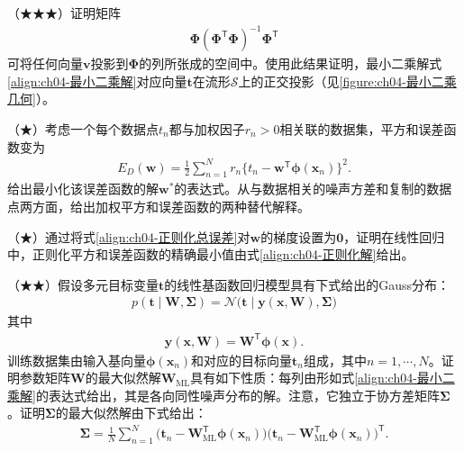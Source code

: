 \documentclass[../../main.tex]{subfiles}
\begin{document}
\begin{exercise}\label{exercise:ch04-04}
（★★★）证明矩阵
\begin{align}
  \boldsymbol{\Phi}(\boldsymbol{\Phi}^{\mathsf{T}}\boldsymbol{\Phi})^{-1}\boldsymbol{\Phi}^{\mathsf{T}}
  \label{align:ch04-习题投影矩阵}
\end{align}
可将任何向量$\boldsymbol{v}$投影到$\boldsymbol{\Phi}$的列所张成的空间中。使用此结果证明，最小二乘解式\eqref{align:ch04-最小二乘解}对应向量$\boldsymbol{t}$在流形$\mathcal{S}$上的正交投影（见\cref{figure:ch04-最小二乘几何}）。
\end{exercise}

\begin{exercise}\label{exercise:ch04-05}
（★）考虑一个每个数据点$t_n$都与加权因子$r_n>0$相关联的数据集，平方和误差函数变为
\begin{align}
  E_D(\boldsymbol{w})=\frac{1}{2}\sum_{n=1}^{N}r_n\bigl\{t_n-\boldsymbol{w}^{\mathsf{T}}\boldsymbol{\phi}(\boldsymbol{x}_n)\bigr\}^2 .
  \label{align:ch04-习题加权误差}
\end{align}
给出最小化该误差函数的解$\boldsymbol{w}^*$的表达式。从与数据相关的噪声方差和复制的数据点两方面，给出加权平方和误差函数的两种替代解释。
\end{exercise}

\begin{exercise}\label{exercise:ch04-06}
（★）通过将式\eqref{align:ch04-正则化总误差}对$\boldsymbol{w}$的梯度设置为$\boldsymbol{0}$，证明在线性回归中，正则化平方和误差函数的精确最小值由式\eqref{align:ch04-正则化解}给出。
\end{exercise}

\begin{exercise}\label{exercise:ch04-07}
（★★）假设多元目标变量$\boldsymbol{t}$的线性基函数回归模型具有下式给出的Gauss分布：
\begin{align}
  p(\boldsymbol{t}\mid\boldsymbol{W},\boldsymbol{\Sigma})=\mathcal{N}\bigl(\boldsymbol{t}\mid\boldsymbol{y}(\boldsymbol{x},\boldsymbol{W}),\boldsymbol{\Sigma}\bigr)
  \label{align:ch04-习题多元Gauss}
\end{align}
其中
\begin{align}
  \boldsymbol{y}(\boldsymbol{x},\boldsymbol{W})=\boldsymbol{W}^{\mathsf{T}}\boldsymbol{\phi}(\boldsymbol{x}) .
  \label{align:ch04-习题多元均值}
\end{align}
训练数据集由输入基向量$\boldsymbol{\phi}(\boldsymbol{x}_n)$和对应的目标向量$\boldsymbol{t}_n$组成，其中$n=1,\cdots,N$。证明参数矩阵$\boldsymbol{W}$的最大似然解$\boldsymbol{W}_{\mathrm{ML}}$具有如下性质：每列由形如式\eqref{align:ch04-最小二乘解}的表达式给出，其是各向同性噪声分布的解。注意，它独立于协方差矩阵$\boldsymbol{\Sigma}$。证明$\boldsymbol{\Sigma}$的最大似然解由下式给出：
\begin{align}
  \boldsymbol{\Sigma}=\frac{1}{N}\sum_{n=1}^{N}\bigl(\boldsymbol{t}_n-\boldsymbol{W}_{\mathrm{ML}}^{\mathsf{T}}\boldsymbol{\phi}(\boldsymbol{x}_n)\bigr)\bigl(\boldsymbol{t}_n-\boldsymbol{W}_{\mathrm{ML}}^{\mathsf{T}}\boldsymbol{\phi}(\boldsymbol{x}_n)\bigr)^{\mathsf{T}} .
  \label{align:ch04-习题协方差ML}
\end{align}
\end{exercise}
\end{document}

